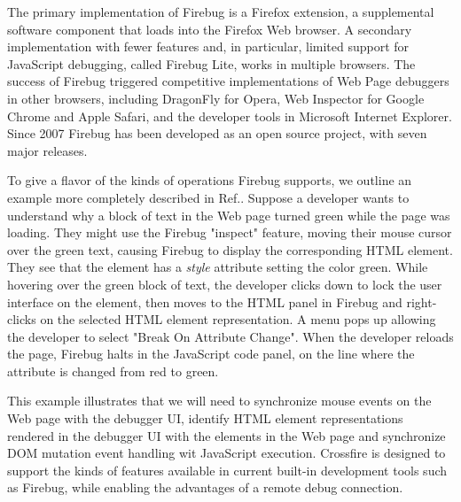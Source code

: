 The primary implementation of Firebug is a Firefox extension, a supplemental
software component that loads into the Firefox Web browser. A secondary
implementation with fewer features and, in particular, limited support for
JavaScript debugging, called Firebug Lite, works in multiple browsers. The
success of Firebug triggered competitive implementations of Web Page debuggers in other
browsers, including DragonFly for Opera\cite{opera-dragonfly}, Web Inspector for
Google Chrome and Apple Safari\cite{WebInspector}, and the developer tools in
Microsoft Internet Explorer\cite{IETools}. Since 2007 Firebug has been developed
as an open source project, with seven major releases.

To give a flavor of the kinds of operations Firebug supports, we outline  an
example more completely described in Ref.\cite{jjb-www2010}. Suppose a developer
wants to understand why a block of text in the Web page turned green while the
page was loading. They might use the Firebug "inspect" feature, moving their mouse 
cursor over the green text, causing Firebug
to display the corresponding HTML element. They see that the element has a
\textit{style} attribute setting the color green. While hovering over the green
block of text, the developer clicks down to lock the user interface on the
element, then moves to the HTML panel in Firebug and right-clicks on the
selected HTML element representation. A menu pops up allowing the developer to
select "Break On Attribute Change". When the developer reloads the page, Firebug
halts in the JavaScript code panel, on the line where the attribute is changed
from red to green.

This example illustrates that we will need to synchronize mouse events on the
Web page with the debugger UI, identify HTML element representations rendered in
the debugger UI with the elements in the Web page and synchronize DOM mutation
event handling wit JavaScript execution.
Crossfire is designed to support the kinds of features available in current built-in
development tools such as Firebug, while enabling the advantages of a remote
debug connection.



